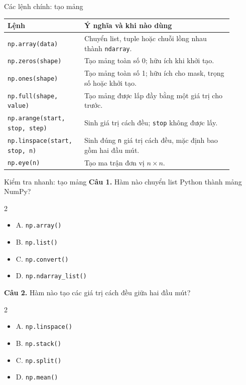 \documentclass[aspectratio=169,11pt]{beamer}
\newcommand{\quiztitle}[1]{\textbf{\textcolor{QuizOrange}{#1}}}
\begin{document}
\begin{frame}{Các lệnh chính: tạo mảng}
\small
\begin{tabular}{p{0.28\linewidth}p{0.61\linewidth}}
\toprule
\textbf{Lệnh} & \textbf{Ý nghĩa và khi nào dùng} \\
\midrule
\texttt{np.array(data)} & Chuyển list, tuple hoặc chuỗi lồng nhau thành \texttt{ndarray}. \\
\texttt{np.zeros(shape)} & Tạo mảng toàn số 0; hữu ích khi khởi tạo. \\
\texttt{np.ones(shape)} & Tạo mảng toàn số 1; hữu ích cho mask, trọng số hoặc khởi tạo. \\
\texttt{np.full(shape, value)} & Tạo mảng được lấp đầy bằng một giá trị cho trước. \\
\texttt{np.arange(start, stop, step)} & Sinh giá trị cách đều; \texttt{stop} không được lấy. \\
\texttt{np.linspace(start, stop, n)} & Sinh đúng \texttt{n} giá trị cách đều, mặc định bao gồm hai đầu mút. \\
\texttt{np.eye(n)} & Tạo ma trận đơn vị \(n\times n\). \\
\bottomrule
\end{tabular}
\end{frame}

\begin{frame}{Kiểm tra nhanh: tạo mảng}
\small
\quiztitle{Câu 1.} Hàm nào chuyển list Python thành mảng NumPy?
\begin{multicols}{2}
\begin{itemize}
  \item A. \texttt{np.array()}
  \item B. \texttt{np.list()}
  \item C. \texttt{np.convert()}
  \item D. \texttt{np.ndarray\_list()}
\end{itemize}
\end{multicols}
\vspace{0.4em}
\quiztitle{Câu 2.} Hàm nào tạo các giá trị cách đều giữa hai đầu mút?
\begin{multicols}{2}
\begin{itemize}
  \item A. \texttt{np.linspace()}
  \item B. \texttt{np.stack()}
  \item C. \texttt{np.split()}
  \item D. \texttt{np.mean()}
\end{itemize}
\end{multicols}
\end{frame}
\end{document}
